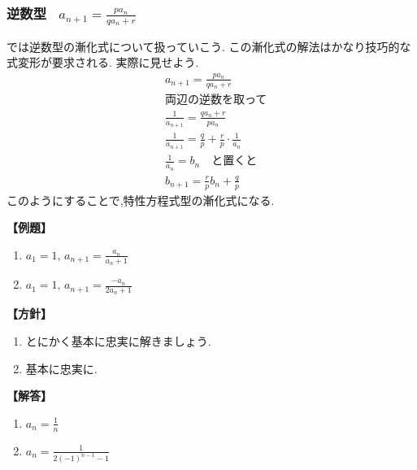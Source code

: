 
\subsubsection{逆数型  \, $\displaystyle a_{n+1}=\frac{pa_n}{qa_n+r}$}
では逆数型の漸化式について扱っていこう.
この漸化式の解法はかなり技巧的な式変形が要求される.
実際に見せよう.
\begin{align*}
   & a_{n+1}=\frac{pa_n}{qa_n+r}                                 \\
   & \text{両辺の逆数を取って}                                            \\
   & \frac{1}{a_{n+1}}=\frac{qa_n+r}{pa_n}                       \\
   & \frac{1}{a_{n+1}}=\frac{q}{p}+\frac{r}{p}\cdot\frac{1}{a_n} \\
  & \frac{1}{a_n}=b_n \quad \text{と置くと}                \\
   & b_{n+1}=\frac{r}{p}b_n+\frac{q}{p}
\end{align*}
このようにすることで,特性方程式型の漸化式になる.

\noindent \textbf{【例題】}
\begin{enumerate}[label=(\arabic*),parsep=3pt]
  \item $\displaystyle a_1=1,\, a_{n+1}=\frac{a_n}{a_n+1}$
  \item $\displaystyle a_1=1,\, a_{n+1}=\frac{-a_n}{2a_n+1}$
\end{enumerate}

\noindent\textbf{【方針】}
\begin{enumerate}[label=(\arabic*),parsep=3pt]
  \item とにかく基本に忠実に解きましょう.
  \item 基本に忠実に.
\end{enumerate}

\noindent\textbf{【解答】}
\begin{enumerate}[label=(\arabic*),parsep=3pt]
  \item $\displaystyle a_n=\frac{1}{n}$
  \item $\displaystyle a_n=\frac{1}{2(-1)^{n-1}-1}$
\end{enumerate}


